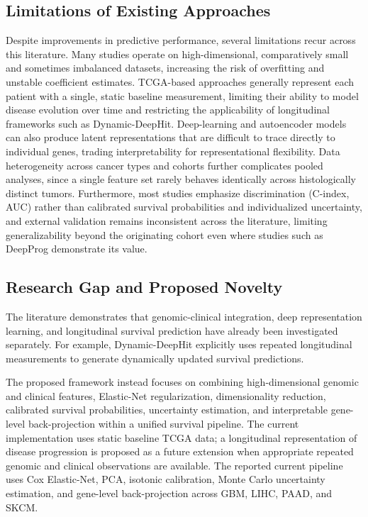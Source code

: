 \documentclass[10pt,a4paper]{article}
\begin{document}
\subsection{Limitations of Existing Approaches}

Despite improvements in predictive performance, several limitations recur across this literature. Many studies operate on high-dimensional, comparatively small and sometimes imbalanced datasets, increasing the risk of overfitting and unstable coefficient estimates. TCGA-based approaches generally represent each patient with a single, static baseline measurement, limiting their ability to model disease evolution over time and restricting the applicability of longitudinal frameworks such as Dynamic-DeepHit. Deep-learning and autoencoder models can also produce latent representations that are difficult to trace directly to individual genes, trading interpretability for representational flexibility. Data heterogeneity across cancer types and cohorts further complicates pooled analyses, since a single feature set rarely behaves identically across histologically distinct tumors. Furthermore, most studies emphasize discrimination (C-index, AUC) rather than calibrated survival probabilities and individualized uncertainty, and external validation remains inconsistent across the literature, limiting generalizability beyond the originating cohort even where studies such as DeepProg demonstrate its value.

\subsection{Research Gap and Proposed Novelty}

The literature demonstrates that genomic-clinical integration, deep representation learning, and longitudinal survival prediction have already been investigated separately. For example, Dynamic-DeepHit explicitly uses repeated longitudinal measurements to generate dynamically updated survival predictions.

The proposed framework instead focuses on combining high-dimensional genomic and clinical features, Elastic-Net regularization, dimensionality reduction, calibrated survival probabilities, uncertainty estimation, and interpretable gene-level back-projection within a unified survival pipeline. The current implementation uses static baseline TCGA data; a longitudinal representation of disease progression is proposed as a future extension when appropriate repeated genomic and clinical observations are available. The reported current pipeline uses Cox Elastic-Net, PCA, isotonic calibration, Monte Carlo uncertainty estimation, and gene-level back-projection across GBM, LIHC, PAAD, and SKCM.
\end{document}
